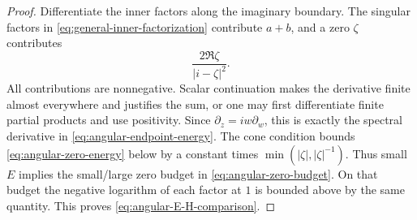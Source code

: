 \begin{proof}
Differentiate the inner factors along the imaginary boundary.  The
singular factors in \eqref{eq:general-inner-factorization} contribute
$a+b$, and a zero $\zeta$ contributes
\begin{equation}\label{eq:angular-zero-energy}
 \frac{2\Re\zeta}{|i-\zeta|^2}.
\end{equation}
All contributions are nonnegative.  Scalar continuation makes the
derivative finite almost everywhere and justifies the sum, or one may
first differentiate finite partial products and use positivity.
Since $\partial_z=iw\partial_w$, this is exactly the spectral
derivative in \eqref{eq:angular-endpoint-energy}.  The cone condition
bounds \eqref{eq:angular-zero-energy} below by a constant times
$\min(|\zeta|,|\zeta|^{-1})$.  Thus small $E$ implies the small/large
zero budget in \eqref{eq:angular-zero-budget}.  On that budget the
negative logarithm of each factor at $1$ is bounded above by the same
quantity.  This proves \eqref{eq:angular-E-H-comparison}.


\end{proof}
